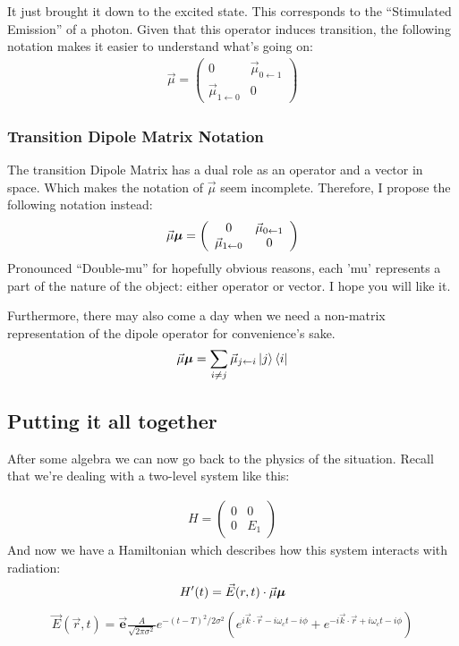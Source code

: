 It just brought it down to the excited state.  This corresponds to the ``Stimulated Emission'' of a photon.  Given that this operator induces transition, the following notation makes it easier to understand what's going on:
\begin{align}
	\vec{\mu} = \left( \begin{array}{ccc}
		0 & \vec{\mu}_{0 \leftarrow 1} \\
		\vec{\mu}_{1 \leftarrow 0} & 0 \end{array} \right)
\end{align}

\subsubsection{Transition Dipole Matrix Notation}
The transition Dipole Matrix has a dual role as an operator and a vector in space.  Which makes the notation of $\vec{\mu}$ seem incomplete.  Therefore, I propose the following notation instead:
\begin{align}
	\vec{\mu} \boldsymbol{\mu} = \left( \begin{array}{ccc}
		0 & \vec{\mu}_{0 \leftarrow 1} \\
		\vec{\mu}_{1 \leftarrow 0} & 0 \end{array} \right)
\end{align}
Pronounced ``Double-mu'' for hopefully obvious reasons, each 'mu' represents a part of the nature of the object: either operator or vector.  I hope you will like it.

Furthermore, there may also come a day when we need a non-matrix representation of the dipole operator for convenience's sake.
\begin{align}
	\vec{\mu} \boldsymbol{\mu} = \sum_{i \neq j} \vec{\mu}_{j \leftarrow i} \ket{j} \bra{i}
\end{align}


\subsection{Putting it all together}
After some algebra we can now go back to the physics of the situation.  Recall that we're dealing with a two-level system like this:

\begin{align}
	H = \left( \begin{array}{ccc}
		0 & 0 \\
		0 & E_1 \end{array} \right)
\end{align}
And now we have a Hamiltonian which describes how this system interacts with radiation:
\begin{align}
	H'(t) = \vec{E}(r, t) \cdot \vec{\mu} \boldsymbol{\mu}
\end{align}
\begin{align}
	\vec{E}(\vec{r}, t) = \vec{\textbf{e}} \frac{A}{\sqrt{2 \pi \sigma^2}} e^{-(t - T)^2 / 2 \sigma^2} \left( e^{i \vec{k} \cdot \vec{r} - i \omega_c t - i \phi}  + e^{-i \vec{k} \cdot \vec{r} + i \omega_c t - i \phi} \right)
\end{align}

